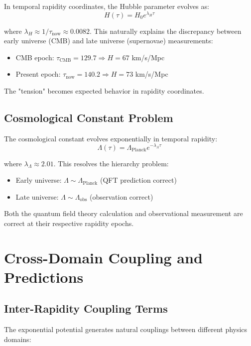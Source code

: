 \documentclass[12pt,a4paper]{article}
\begin{document}
In temporal rapidity coordinates, the Hubble parameter evolves as:
\begin{equation}
H(\tau) = H_0 e^{\lambda_H \tau}
\end{equation}

where $\lambda_H \approx 1/\tau_{\text{now}} \approx 0.0082$. This naturally explains the discrepancy between early universe (CMB) and late universe (supernovae) measurements:
\begin{itemize}
    \item CMB epoch: $\tau_{\text{CMB}} = 129.7 \Rightarrow H = 67$ km/s/Mpc
    \item Present epoch: $\tau_{\text{now}} = 140.2 \Rightarrow H = 73$ km/s/Mpc
\end{itemize}

The "tension" becomes expected behavior in rapidity coordinates.

\subsection{Cosmological Constant Problem}

The cosmological constant evolves exponentially in temporal rapidity:
\begin{equation}
\Lambda(\tau) = \Lambda_{\text{Planck}} e^{-\lambda_\Lambda \tau}
\end{equation}

where $\lambda_\Lambda \approx 2.01$. This resolves the hierarchy problem:
\begin{itemize}
    \item Early universe: $\Lambda \sim \Lambda_{\text{Planck}}$ (QFT prediction correct)
    \item Late universe: $\Lambda \sim \Lambda_{\text{obs}}$ (observation correct)
\end{itemize}

Both the quantum field theory calculation and observational measurement are correct at their respective rapidity epochs.

\section{Cross-Domain Coupling and Predictions}

\subsection{Inter-Rapidity Coupling Terms}

The exponential potential generates natural couplings between different physics domains:
\end{document}
